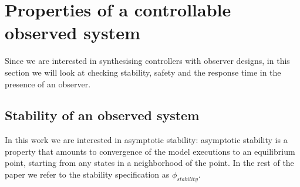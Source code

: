 \documentclass[sigconf]{llncs}
\begin{document}




\section{Properties of a controllable observed system}\label{sec:cof_verification}

Since we are interested in synthesising controllers with observer
designs, in this section we will look at checking stability, safety
and the response time in the presence of an observer.


\subsection{Stability of an observed system}\label{sec:cof_stability}
In this work we are interested in asymptotic stability: asymptotic
stability is a property that amounts to convergence of the model
executions to an equilibrium point, starting from any states in a
neighborhood of the point. In the rest of the paper we refer to the
stability specification as $\phi_\mathit{stability}$.
\end{document}
